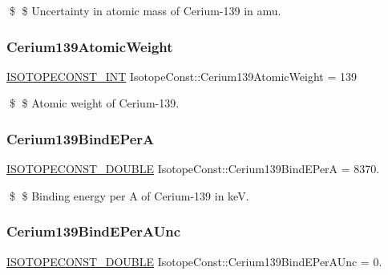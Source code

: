 \$ \$ Uncertainty in atomic mass of Cerium-\/139 in amu. \mbox{\label{group___isotope_const-_cerium-_ce139_gaded7dd77b1cec537324d91d16ef26abd}} 
\subsubsection{\texorpdfstring{Cerium139\+Atomic\+Weight}{Cerium139AtomicWeight}}
{\footnotesize\ttfamily \mbox{\hyperlink{group___isotope_const-_macros_ga5f18360b3e99483a35c32d789e62621c}{I\+S\+O\+T\+O\+P\+E\+C\+O\+N\+S\+T\+\_\+\+I\+NT}} Isotope\+Const\+::\+Cerium139\+Atomic\+Weight = 139}

\$ \$ Atomic weight of Cerium-\/139. \mbox{\label{group___isotope_const-_cerium-_ce139_gaad9898cac7289b22b82833dd35b410d4}} 
\subsubsection{\texorpdfstring{Cerium139\+Bind\+E\+PerA}{Cerium139BindEPerA}}
{\footnotesize\ttfamily \mbox{\hyperlink{group___isotope_const-_macros_ga8f45a7272ce02c0b4c65c44636ed719a}{I\+S\+O\+T\+O\+P\+E\+C\+O\+N\+S\+T\+\_\+\+D\+O\+U\+B\+LE}} Isotope\+Const\+::\+Cerium139\+Bind\+E\+PerA = 8370.}

\$ \$ Binding energy per A of Cerium-\/139 in keV. \mbox{\label{group___isotope_const-_cerium-_ce139_gabf097ba03d21b30512d5d19dc340daf6}} 
\subsubsection{\texorpdfstring{Cerium139\+Bind\+E\+Per\+A\+Unc}{Cerium139BindEPerAUnc}}
{\footnotesize\ttfamily \mbox{\hyperlink{group___isotope_const-_macros_ga8f45a7272ce02c0b4c65c44636ed719a}{I\+S\+O\+T\+O\+P\+E\+C\+O\+N\+S\+T\+\_\+\+D\+O\+U\+B\+LE}} Isotope\+Const\+::\+Cerium139\+Bind\+E\+Per\+A\+Unc = 0.}

